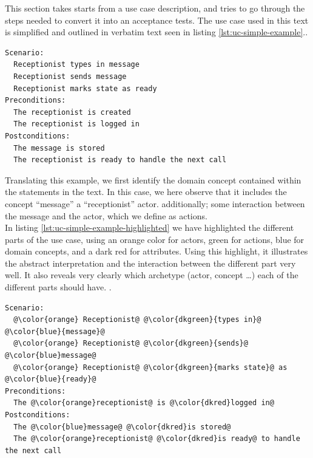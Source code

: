 This section takes starts from a use case description, and tries to go through the steps needed to convert it into an acceptance tests. The use case used in this text is simplified and outlined in verbatim text seen in listing \ref{lst:uc-simple-example}..
\begin{lstlisting}[frame=single,style=usecase, caption=Use case example, label=lst:uc-simple-example]
Scenario:
  Receptionist types in message
  Receptionist sends message
  Receptionist marks state as ready 
Preconditions:
  The receptionist is created
  The receptionist is logged in
Postconditions:
  The message is stored
  The receptionist is ready to handle the next call
\end{lstlisting} 
Translating this example, we first identify the domain concept contained within the statements in the text. In this case, we here observe that it includes the concept ``message'' a ``receptionist'' actor. additionally; some interaction between the message and the actor, which we define as actions.\\
In listing \ref{lst:uc-simple-example-highlighted} we have highlighted the different parts of the use case, using an orange color for actors, green for actions, blue for domain concepts, and a dark red for attributes. Using this highlight, it illustrates the abstract interpretation and the interaction between the different part very well. It also reveals very clearly which archetype (actor, concept \dots) each of the different parts should have. 
.
\begin{lstlisting}[frame=single,style=usecase, caption=Use case example with its different parts highlighted, label=lst:uc-simple-example-highlighted]
Scenario:
  @\color{orange} Receptionist@ @\color{dkgreen}{types in}@ @\color{blue}{message}@
  @\color{orange} Receptionist@ @\color{dkgreen}{sends}@ @\color{blue}message@
  @\color{orange} Receptionist@ @\color{dkgreen}{marks state}@ as @\color{blue}{ready}@
Preconditions:
  The @\color{orange}receptionist@ is @\color{dkred}logged in@
Postconditions:
  The @\color{blue}message@ @\color{dkred}is stored@
  The @\color{orange}receptionist@ @\color{dkred}is ready@ to handle the next call
\end{lstlisting} 
